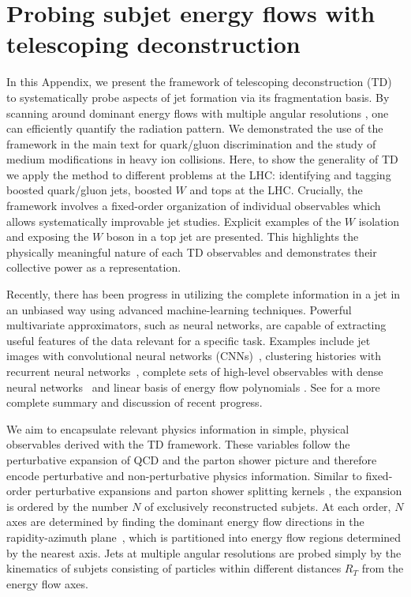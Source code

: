 \documentclass[notoc,preprintnumbers]{JHEP3}
\begin{document}
\section{Probing subjet energy flows with telescoping deconstruction}

In this Appendix, we present the framework of telescoping deconstruction (TD) to systematically probe aspects of jet formation via its fragmentation basis. By scanning around dominant energy flows with multiple angular resolutions \cite{Chien:2013kca,Chien:2014hla}, one can efficiently quantify the radiation pattern. We demonstrated the use of the framework in the main text for quark/gluon discrimination and the study of medium modifications in heavy ion collisions. Here, to show the generality of TD we apply the method to different problems at the LHC: identifying and tagging boosted quark/gluon jets,  boosted $W$ and tops at the LHC. Crucially, the framework involves a fixed-order organization of individual observables which allows systematically improvable jet studies. Explicit examples of the $W$ isolation \cite{Chien:2017xrb} and exposing the $W$ boson in a top jet are presented. This highlights the physically meaningful nature of each TD observables and demonstrates their collective power as a representation.

Recently, there has been progress in utilizing the complete information in a jet in an unbiased way using advanced machine-learning techniques. Powerful multivariate approximators, such as neural networks, are capable of extracting useful features of the data relevant for a specific task. Examples include jet images with convolutional neural networks (CNNs)~\cite{Cogan:2014oua,deOliveira:2015xxd,Komiske:2016rsd,Kasieczka:2017nvn}, clustering histories with recurrent neural networks~\cite{Louppe:2017ipp}, complete sets of high-level observables with dense neural networks~\cite{Datta:2017rhs,Datta:2017lxt,Aguilar-Saavedra:2017rzt} and linear basis of energy flow polynomials \cite{Komiske:2017aww}. See \cite{Larkoski:2017jix} for a more complete summary and discussion of recent progress.

We aim to encapsulate relevant physics information in simple, physical observables derived with the TD framework. These variables follow the perturbative expansion of QCD and the parton shower picture and therefore encode perturbative and non-perturbative physics information. Similar to fixed-order perturbative expansions and parton shower splitting kernels \cite{Nagy:2017ggp}, the expansion is ordered by the number $N$ of exclusively reconstructed subjets. At each order, $N$ axes are determined by finding the dominant energy flow directions in the rapidity-azimuth plane~\cite{Stewart:2010tn,Chien:2013kca,Stewart:2015waa,Thaler:2015xaa}, which is partitioned into energy flow regions determined by the nearest axis. Jets at multiple angular resolutions are probed simply by the kinematics of subjets consisting of particles within different distances $R_T$ from the energy flow axes.
\end{document}
